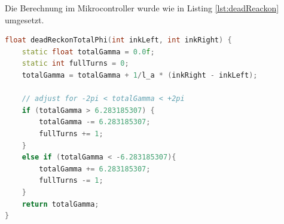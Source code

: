 Die Berechnung im Mikrocontroller wurde wie in Listing \ref{lst:deadReackon} umgesetzt.

\begin{lstlisting}[language=C++, caption=deadReckonTotalPhi, label={lst:deadReackon}]
float deadReckonTotalPhi(int inkLeft, int inkRight) {
	static float totalGamma = 0.0f;
    static int fullTurns = 0;
	totalGamma = totalGamma + 1/l_a * (inkRight - inkLeft);

    // adjust for -2pi < totalGamma < +2pi
    if (totalGamma > 6.283185307) {
        totalGamma -= 6.283185307;
        fullTurns += 1;
    }
    else if (totalGamma < -6.283185307){
        totalGamma += 6.283185307;
        fullTurns -= 1;
    }
	return totalGamma;
}
\end{lstlisting}






\newpage
